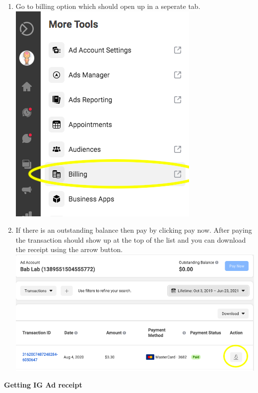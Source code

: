 \documentclass[]{book}
\begin{document}
\begin{enumerate}
\def\labelenumi{\arabic{enumi}.}
\setcounter{enumi}{2}
\item
  Go to billing option which should open up in a seperate tab.
  \includegraphics{images/lab_protocols/fb_pay/pay3.png}
\item
  If there is an outstanding balance then pay by clicking pay now. After paying the transaction should show up at the top of the list and you can download the receipt using the arrow button.
  \includegraphics{images/lab_protocols/fb_pay/pay4.png}
\end{enumerate}

\textbf{Getting IG Ad receipt}
\end{document}
